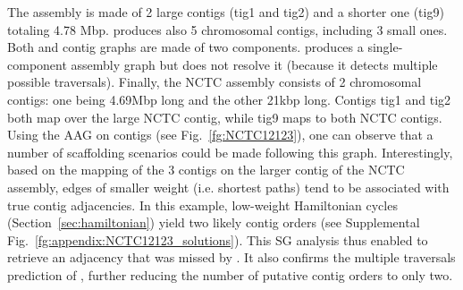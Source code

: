 \documentclass[./main.tex]{subfiles}
\newcommand{\modafterreview}[1]{#1}
\begin{document}
The assembly is made of 2 large contigs (tig1 and tig2) and a shorter one (tig9) totaling 4.78 Mbp. \miniasm produces also 5 chromosomal contigs, including 3 small ones. Both \canu and \miniasm contig graphs are made of two components. \hinge produces a single-component assembly graph but does not resolve it (because it detects multiple possible traversals). \modafterreview{Finally, the NCTC assembly consists of 2 chromosomal contigs: one being 4.69Mbp long and the other 21kbp long. Contigs tig1 and tig2 both map over the large NCTC contig, while tig9 maps to both NCTC contigs.}
%
%
Using the AAG on \canu contigs (see Fig.~\ref{fg:NCTC12123}), one can observe that a number of scaffolding scenarios could be made following this graph. Interestingly, based on the mapping of the 3 contigs on the larger contig of the NCTC assembly, edges of smaller weight (i.e. shortest paths) tend to be associated with true contig adjacencies. In this example, low-weight Hamiltonian cycles (Section~\ref{sec:hamiltonian}) yield two likely contig orders (see Supplemental Fig.~\ref{fg:appendix:NCTC12123_solutions}).
%
This SG analysis thus enabled to retrieve an adjacency that was missed by \canu. It also confirms the multiple traversals prediction of \hinge, further reducing the number of putative contig orders to only two. 

\end{document}
